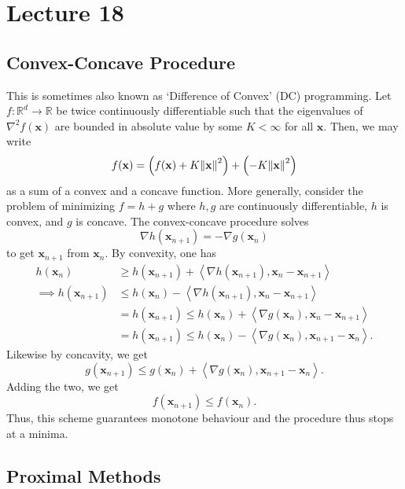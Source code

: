 \section{Lecture 18}

\subsection*{Convex-Concave Procedure}

This is sometimes also known as `Difference of Convex' (DC) programming. Let $f \colon \mathbb{R}^d \to \mathbb{R}$ be twice continuously differentiable such that the eigenvalues of $\nabla^2 f(\mathbf{x})$ are bounded in absolute value by some $K < \infty$ for all $\mathbf{x}$. Then, we may write 
\[
    f(\mathbf{x}) = \left( f(\mathbf{x}) + K\norm{\mathbf{x}}^2 \right) + \left( - K\norm{\mathbf{x}}^2 \right)
\]
as a sum of a convex and a concave function. More generally, consider the problem of minimizing $f = h + g$ where $h,g$ are continuously differentiable, $h$ is convex, and $g$ is concave. The convex-concave procedure solves
\[
    \nabla h(\mathbf{x}_{n+1}) = -\nabla g(\mathbf{x}_n)
\]
to get $\mathbf{x}_{n+1}$ from $\mathbf{x}_n$. By convexity, one has
\begin{align*}
    h(\mathbf{x}_n) &\geq h(\mathbf{x}_{n+1}) + \left\langle \nabla h(\mathbf{x}_{n+1}) , \mathbf{x}_n - \mathbf{x}_{n+1} \right\rangle \\
    \implies h(\mathbf{x}_{n+1}) &\leq h(\mathbf{x}_n) - \left\langle \nabla h(\mathbf{x}_{n+1}) , \mathbf{x}_n - \mathbf{x}_{n+1} \right\rangle \\
    &= h(\mathbf{x}_{n+1}) \leq h(\mathbf{x}_n) + \left\langle \nabla g(\mathbf{x}_n) , \mathbf{x}_n - \mathbf{x}_{n+1} \right\rangle \\
    &= h(\mathbf{x}_{n+1}) \leq h(\mathbf{x}_n) - \left\langle \nabla g(\mathbf{x}_n) , \mathbf{x}_{n+1} - \mathbf{x}_n \right\rangle.
\end{align*}
Likewise by concavity, we get
\[
    g(\mathbf{x}_{n+1}) \leq g(\mathbf{x}_n) + \left\langle \nabla g(\mathbf{x}_n) , \mathbf{x}_{n+1} - \mathbf{x}_n \right\rangle.
\]
Adding the two, we get
\[
    f(\mathbf{x}_{n+1}) \leq f(\mathbf{x}_n). 
\]
Thus, this scheme guarantees monotone behaviour and the procedure thus stops at a minima. 

\subsection*{Proximal Methods}

